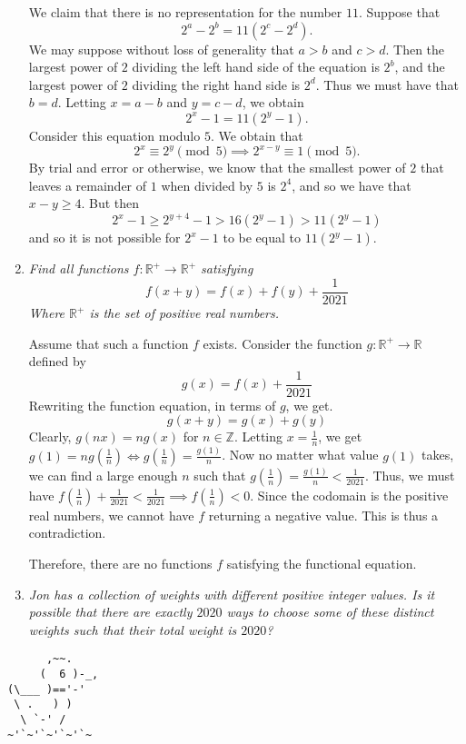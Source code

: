\documentclass{article}
\begin{document}
\begin{enumerate}[1.]
We claim that there is no representation for the number $11$. Suppose that
\[
  2^a - 2^b = 11(2^c - 2^d).
\]
We may suppose without loss of generality that $a > b$ and $c > d$. Then the largest power of $2$ dividing the left hand side of the equation is $2^b$, and the largest power of $2$ dividing the right hand side is $2^d$. Thus we must have that $b = d$. Letting $x = a - b$ and $y = c - d$, we obtain
\[
  2^x - 1 = 11(2^y - 1).
\]
Consider this equation modulo $5$. We obtain that
\[
  2^x \equiv 2^y \pmod 5 \implies 2^{x - y} \equiv 1 \pmod 5.
\]
By trial and error or otherwise, we know that the smallest power of $2$ that leaves a remainder of $1$ when divided by $5$ is $2^4$, and so we have that $x - y \geq 4$. But then
\[
  2^x - 1 \geq 2^{y + 4} - 1 > 16(2^y - 1) > 11(2^y - 1)
\]
and so it is not possible for $2^x - 1$ to be equal to $11(2^y - 1)$.


\item %
{\itshape Find all functions $f: \mathbb{R}^+ \rightarrow \mathbb{R}^+$ satisfying 
$$f(x + y) = f(x) + f(y) + \frac{1}{2021} $$
Where $\mathbb{R}^+$ is the set of positive real numbers. }

Assume that such a function $f$ exists. Consider the function $g: \mathbb{R}^+ \rightarrow \mathbb{R}$ defined by 
$$g(x) = f(x) + \frac{1}{2021}$$
Rewriting the function equation, in terms of $g$, we get. 
$$g(x + y) = g(x) + g(y)$$
Clearly, $g(nx) = ng(x)$ for $n \in \mathbb{Z}$. Letting $x = \frac{1}{n}$, we get $g(1) = ng(\frac{1}{n}) \iff g(\frac{1}{n}) = \frac{g(1)}{n}$. Now no matter what value $g(1)$ takes, we can find a large enough $n$ such that $g(\frac{1}{n}) = \frac{g(1)}{n} < \frac{1}{2021}$. Thus, we must have $f(\frac{1}{n}) + \frac{1}{2021} < \frac{1}{2021} \implies f(\frac{1}{n}) < 0$. Since the codomain is the positive real numbers, we cannot have $f$ returning a negative value. This is thus a contradiction.

Therefore, there are no functions $f$ satisfying the functional equation.


\item %
{\itshape Jon has a collection of weights with different positive integer values. Is it possible that there are exactly $2020$ ways to choose some of these distinct weights such that their total weight is $2020$?}

\end{enumerate}


\vfill
\centering
\begin{BVerbatim}
      ,~~.
     (  6 )-_,
(\___ )=='-'
 \ .   ) )
  \ `-' /    
~'`~'`~'`~'`~
\end{BVerbatim}
\end{document}
